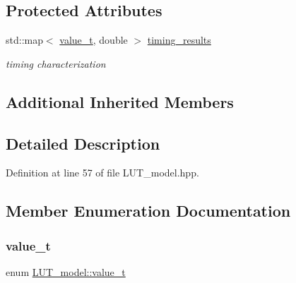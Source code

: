 \subsection*{Protected Attributes}
\begin{DoxyCompactItemize}
\item 
std\+::map$<$ \hyperlink{classLUT__model_a863cc03b53b14df7344ada5a1bed2b20}{value\+\_\+t}, double $>$ \hyperlink{classLUT__model_aaa1328cce2f2b3c3a78dbf9ba2b2d879}{timing\+\_\+results}
\begin{DoxyCompactList}\small\item\em timing characterization \end{DoxyCompactList}\end{DoxyCompactItemize}
\subsection*{Additional Inherited Members}


\subsection{Detailed Description}


Definition at line 57 of file L\+U\+T\+\_\+model.\+hpp.



\subsection{Member Enumeration Documentation}
\mbox{\label{classLUT__model_a863cc03b53b14df7344ada5a1bed2b20}} 
\subsubsection{\texorpdfstring{value\+\_\+t}{value\_t}}
{\footnotesize\ttfamily enum \hyperlink{classLUT__model_a863cc03b53b14df7344ada5a1bed2b20}{L\+U\+T\+\_\+model\+::value\+\_\+t}}

